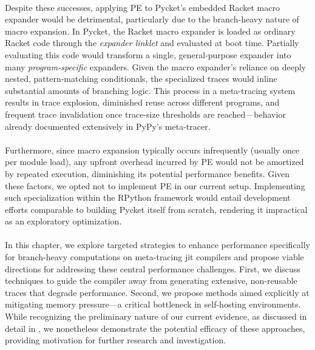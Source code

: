   \paragraph{}%
    Despite these successes, applying PE to Pycket's embedded Racket macro expander would be detrimental, particularly due to the branch-heavy nature of macro expansion. In Pycket, the Racket macro expander is loaded as ordinary Racket code through the \textit{expander linklet} and evaluated at boot time. Partially evaluating this code would transform a single, general-purpose expander into many \emph{program-specific} expanders. Given the macro expander's reliance on deeply nested, pattern-matching conditionals, the specialized traces would inline substantial amounts of branching logic. This process in a meta-tracing system results in trace explosion, diminished reuse across different programs, and frequent trace invalidation once trace-size thresholds are reached—behavior already documented extensively in PyPy’s meta-tracer.

  \paragraph{}%
    Furthermore, since macro expansion typically occurs infrequently (usually once per module load), any upfront overhead incurred by PE would not be amortized by repeated execution, diminishing its potential performance benefits. Given these factors, we opted not to implement PE in our current setup. Implementing such specialization within the RPython framework would entail development efforts comparable to building Pycket itself from scratch, rendering it impractical as an exploratory optimization.

  \paragraph{}%
    In this chapter, we explore targeted strategies to enhance performance specifically for branch-heavy computations on meta-tracing \gls{jit} compilers and propose viable directions for addressing these central performance challenges. First, we discuss techniques to guide the compiler away from generating extensive, non-reusable traces that degrade performance. Second, we propose methods aimed explicitly at mitigating memory pressure—a critical bottleneck in self-hosting environments. While recognizing the preliminary nature of our current evidence, as discussed in detail in , we nonetheless demonstrate the potential efficacy of these approaches, providing motivation for further research and investigation.

